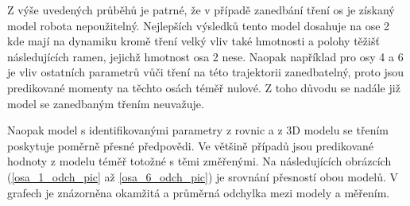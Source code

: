Z výše uvedených průběhů je patrné, že v případě zanedbání tření os je získaný model robota nepoužitelný. Nejlepších výsledků tento model dosahuje na ose 2 kde mají na dynamiku kromě tření velký vliv také hmotnosti a polohy těžišť následujících ramen, jejichž hmotnost osa 2 nese. Naopak například pro osy 4 a 6 je vliv ostatních parametrů vůči tření na této trajektorii zanedbatelný, proto jsou predikované momenty na těchto osách téměř nulové. Z toho důvodu se nadále již model se zanedbaným třením neuvažuje.

Naopak model s identifikovanými parametry z rovnic a z 3D modelu se třením poskytuje poměrně přesné předpovědi. Ve většině případů jsou predikované hodnoty z modelu téměř totožné s těmi změřenými. Na následujících obrázcích (\ref{osa_1_odch_pic} až \ref{osa_6_odch_pic}) je srovnání přesností obou modelů. V grafech je znázorněna okamžitá a průměrná odchylka mezi modely a měřením.


